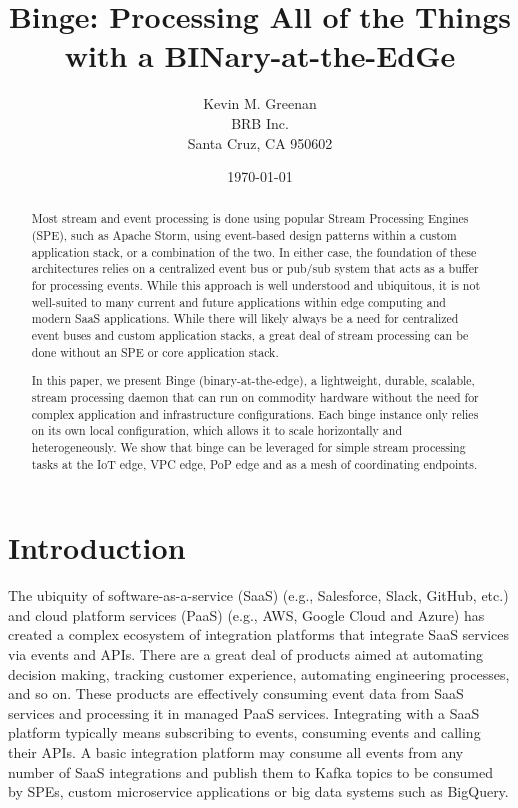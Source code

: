 \documentclass[10pt,twocolumn]{article}
\title{Binge: Processing All of the Things with a BINary-at-the-EdGe}
\author{
        Kevin M. Greenan\\
        BRB Inc.\\
        Santa Cruz, CA 950602
}
\date{\today}
\begin{document}
\maketitle

\begin{abstract}
Most stream and event processing is done using popular Stream Processing
Engines (SPE), such as Apache Storm, using event-based design patterns within a
custom application stack, or a combination of the two.  In either case, the
foundation of these architectures relies on a centralized event bus or pub/sub
system that acts as a buffer for processing events.  While this approach is
well understood and ubiquitous, it is not well-suited to many current and
future applications within edge computing and modern SaaS applications.  While
there will likely always be a need for centralized event buses and custom
application stacks, a great deal of stream processing can be done without an
SPE or core application stack.

In this paper, we present Binge (binary-at-the-edge), a lightweight, durable,
scalable, stream processing daemon that can run on commodity hardware without
the need for complex application and infrastructure configurations.  Each binge
instance only relies on its own local configuration, which allows it to scale
horizontally and heterogeneously.  We show that binge can be leveraged for
simple stream processing tasks at the IoT edge, VPC edge, PoP edge and as a
mesh of coordinating endpoints.
\end{abstract}


\section{Introduction}
The ubiquity of software-as-a-service (SaaS) (e.g., Salesforce, Slack, GitHub,
etc.) and cloud platform services (PaaS) (e.g., AWS, Google Cloud and Azure)
has created a complex ecosystem of integration platforms that integrate SaaS
services via events and APIs.  There are a great deal of products aimed at
automating decision making, tracking customer experience, automating
engineering processes, and so on.   These products are effectively consuming
event data from SaaS services and  processing it in managed PaaS services.
Integrating with a SaaS platform typically means subscribing to events,
consuming events and calling their APIs.  A basic integration platform may
consume all events from any number of SaaS integrations and publish them to
Kafka topics to be consumed by SPEs, custom microservice applications or big
data systems such as BigQuery.  
\end{document}
